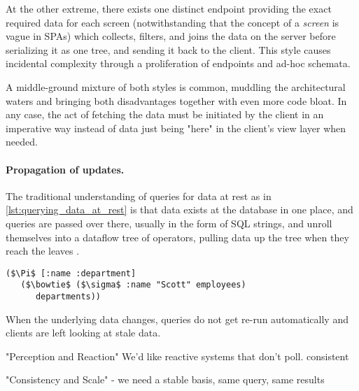 At the other extreme, there exists one distinct endpoint providing the exact required data for each screen (notwithstanding that the concept of a \emph{screen} is vague in SPAs) which collects, filters, and joins the data on the server before serializing it as one tree, and sending it back to the client. This style causes incidental complexity through a proliferation of endpoints and ad-hoc schemata.

A middle-ground mixture of both styles is common, muddling the architectural waters and bringing both disadvantages together with even more code bloat. In any case, the act of fetching the data must be initiated by the client in an imperative way instead of data just being "here" in the client's view layer when needed.


\paragraph{Propagation of updates.}
The traditional understanding of queries for data at rest as in \autoref{lst:querying_data_at_rest} is that data exists at the database in one place, and queries are passed over there, usually in the form of SQL strings, and unroll themselves into a dataflow tree of operators, pulling data up the tree when they reach the leaves \cite{alvaro2015isee}.

\begin{lstlisting}[label={lst:querying_data_at_rest},morekeywords={employees,departments},caption=Querying data at rest \cite{alvaro2015isee}]
($\Pi$ [:name :department]
   ($\bowtie$ ($\sigma$ :name "Scott" employees)
      departments))
\end{lstlisting}

When the underlying data changes, queries do not get re-run automatically and clients are left looking at stale data.



"Perception and Reaction" We'd like reactive systems that don't poll. consistent


"Consistency and Scale" - we need a stable basis, same query, same results
